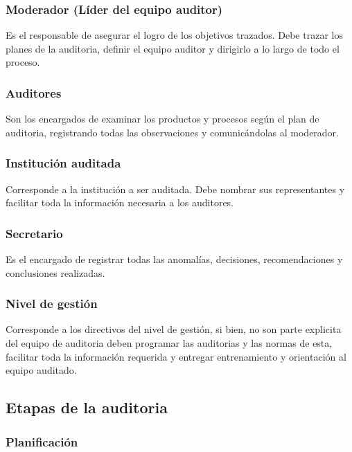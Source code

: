 \subsubsection{Moderador (Líder del equipo auditor)}

Es el responsable de asegurar el logro de los objetivos trazados. Debe trazar los planes de la auditoria, definir el equipo auditor y dirigirlo a lo largo de todo el proceso. 

\subsubsection{Auditores}

Son los encargados de examinar los productos y procesos según el plan de auditoria, registrando todas las observaciones y comunicándolas al moderador.

\subsubsection{Institución auditada}

Corresponde a la institución a ser auditada. Debe nombrar sus representantes y facilitar toda la información necesaria a los auditores.

\subsubsection{Secretario}

Es el encargado de registrar todas las anomalías, decisiones, recomendaciones y conclusiones realizadas.

\subsubsection{Nivel de gestión}

Corresponde a los directivos del nivel de gestión, si bien, no son parte explicita del equipo de auditoria deben programar las auditorias y las normas de esta, facilitar toda la información requerida y entregar entrenamiento y orientación al equipo auditado. 

\subsection{Etapas de la auditoria}

\subsubsection{Planificación}

